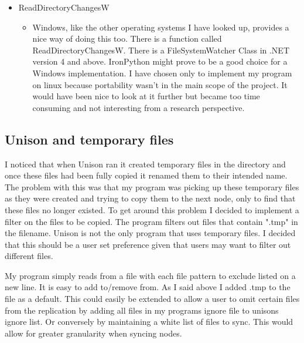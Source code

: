 \documentclass[12pt]{article}
\begin{document}
\begin{itemize}
    \item ReadDirectoryChangesW
        \begin{itemize}
        \item Windows, like the other operating systems
        I have looked up, provides a nice way of doing this
        too. There is a function called ReadDirectoryChangesW.
        There is a FileSystemWatcher Class in .NET version 4 and
        above. IronPython might prove to be a good choice for a
        Windows implementation. I have chosen only to implement
        my program on linux because portability wasn't in the main
        scope of the project. It would have been nice to look
        at it further but became too time consuming and not interesting
        from a research perspective.
        \end{itemize}
\end{itemize}

\subsection{Unison and temporary files}
I noticed that when Unison ran it created temporary files in the
directory and once these files had been fully copied it renamed
them to their intended name. The problem with this was that my program
was picking up these temporary files as they were created and trying to
copy them to the next node, only to find that these files no longer existed.
To get around this problem I decided to implement a filter on the files to
be copied. The program filters out files that contain ".tmp" in the filename.
Unison is not the only program that uses temporary files. I decided that this
should be a user set preference given that users may want to filter out different
files.

My program simply reads from a file with each file pattern to exclude
listed on a new line. It is easy to add to/remove from. As I said above
I added .tmp to the file as a default. This could easily be extended
to allow a user to omit certain files from the replication by adding
all files in my programs ignore file to unisons ignore list. Or conversely
by maintaining a white list of files to sync. This would allow for
greater granularity when syncing nodes.
\end{document}
